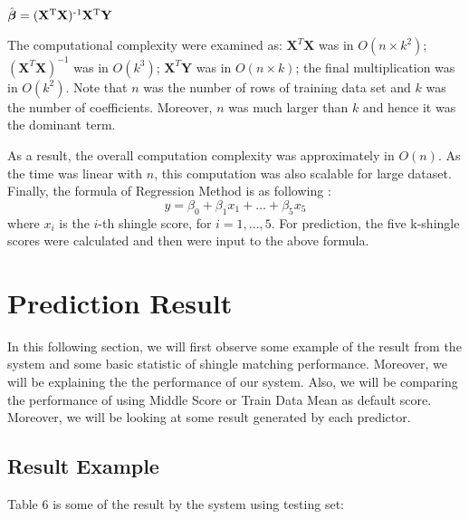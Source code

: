 \begin{center}
\(\hat{\boldsymbol{\beta}} = (\textbf{X} \textsuperscript{T} \textbf{X} ) \textsuperscript{-1} \textbf{X} \textsuperscript{T} \textbf{Y}  \) \\
\end{center}

The computational complexity were examined as: \(\textbf{X}^{T}\textbf{X}\) was in \(O(n \times k^2)\); \((\textbf{X}^{T}\textbf{X})^{-1}\) was in \(O(k^3)\);
\(\textbf{X}^T\textbf{Y}\) was in \(O(n\times k)\); the final multiplication was in \(O(k^2)\).
Note that \(n\) was the number of rows of training data set and \(k\) was the number of coefficients. Moreover, \(n\) was much larger than \(k\) and hence it was the dominant term.

As a result, the overall computation complexity was approximately in \(O(n)\).
As the time was linear with \(n\), this computation was also scalable for large dataset. Finally, the formula of Regression Method is as following : 
\begin{displaymath}
y = \beta_0  + \beta_1 x_1 + \dots + \beta_5 x_5
\end{displaymath}
where $x_i$ is the $i$-th shingle score, for $i=1,...,5$. For prediction, the five k-shingle scores were calculated and then were input to the above formula.

\section{Prediction Result}
In this following section, we will first observe some example of the result from the system and some basic statistic of shingle matching performance. Moreover, we will be explaining the the performance of our system. Also, we will be comparing the performance of using Middle Score or Train Data Mean as default score. Moreover, we will be looking at some result generated by each predictor.


\subsection{Result Example}
Table 6 is some of the result by the system using testing set:

